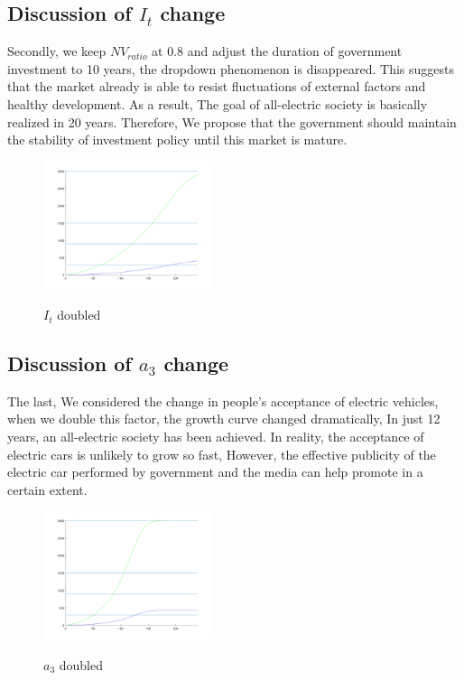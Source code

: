 \documentclass{mcmthesis}
\begin{document}
\subsection{Discussion of $I_t$ change}
Secondly, we keep $NV_{ratio}$ at 0.8 and adjust the duration of government investment to 10 years,  the dropdown phenomenon is disappeared. This suggests that the market already is able to resist fluctuations of  external factors and healthy development. As a result, The goal of all-electric society is basically realized in 20 years. Therefore, We propose that the government should maintain the stability of investment policy until this market is mature.
\begin{figure}[htbp]
	\centering
	\includegraphics[width=5cm]{img/ireland10year.png}\\
	\caption{$I_t$ doubled}
	\label{Figure7}
\end{figure}
\subsection{Discussion of $a_3$ change}
The last, We considered the change in people's acceptance of electric vehicles, when we double this factor, the growth curve changed dramatically, In just 12 years, an all-electric society has been achieved. In reality, the acceptance of electric cars is unlikely to grow so fast, However, the effective publicity of the electric car performed by government and the media can help promote in a certain extent.
\begin{figure}[htbp]
	\centering
	\includegraphics[width=5cm]{img/ireland014.png}\\
	\caption{$a_3$ doubled}
	\label{Figure7}
\end{figure}
\end{document}
